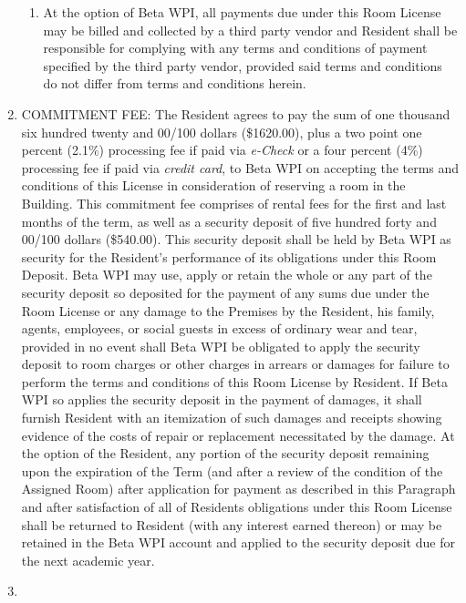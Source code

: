 \documentclass[12pt]{article}
\begin{document}
\begin{enumerate}
\begin{enumerate}[label=\Alph*.]
\item At the option of Beta WPI, all payments due under this Room License may be billed and collected by a third party vendor and Resident shall be responsible for complying with any terms and conditions of payment specified by the third party vendor, provided said terms and conditions do not differ from terms and conditions herein.

\end{enumerate}

\item\label{itm:commitmentfee}

COMMITMENT FEE\@: The Resident agrees to pay the sum of one thousand six hundred twenty and 00/100 dollars (\$1620.00), plus a two point one percent (2.1\%) processing fee if paid via \textit{e-Check} or a four percent (4\%) processing fee if paid via \textit{credit card}, to Beta WPI on accepting the terms and conditions of this License in consideration of reserving a room in the Building.
This commitment fee comprises of rental fees for the first and last months of the term, as well as a security deposit of five hundred forty and 00/100 dollars (\$540.00).
This security deposit shall be held by Beta WPI as security for the Resident’s performance of its obligations under this Room Deposit.
Beta WPI may use, apply or retain the whole or any part of the security deposit so deposited for the payment of any sums due under the Room License or any damage to the Premises by the Resident, his family, agents, employees, or social guests in excess of ordinary wear and tear, provided in no event shall Beta WPI be obligated to apply the security deposit to room charges or other charges in arrears or damages for failure to perform the terms and conditions of this Room License by Resident.
If Beta WPI so applies the security deposit in the payment of damages, it shall furnish Resident with an itemization of such damages and receipts showing evidence of the costs of repair or replacement necessitated by the damage.
At the option of the Resident, any portion of the security deposit remaining upon the expiration of the Term (and after a review of the condition of the Assigned Room) after application for payment as described in this Paragraph and after satisfaction of all of Residents obligations under this Room License shall be returned to Resident (with any interest earned thereon) or may be retained in the Beta WPI account and applied to the security deposit due for the next academic year.

\item\label{itm:mealplan}


\end{enumerate}
\end{document}

